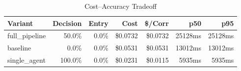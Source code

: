 \begin{table}[htbp]
\centering
\caption{Cost--Accuracy Tradeoff}
\label{tab:cost-accuracy}
\begin{tabular}{l rr rr rr}
\toprule
Variant & Decision & Entry & Cost & \$/Corr & p50 & p95 \\
\midrule
  full\_pipeline & 50.0\% & 0.0\% & \$0.0732 & \$0.0732 & 25128ms & 25128ms \\
  baseline & 0.0\% & 0.0\% & \$0.0531 & \$0.0531 & 13012ms & 13012ms \\
  single\_agent & 100.0\% & 0.0\% & \$0.0231 & \$0.0115 & 5935ms & 5935ms \\
\bottomrule
\end{tabular}
\end{table}
